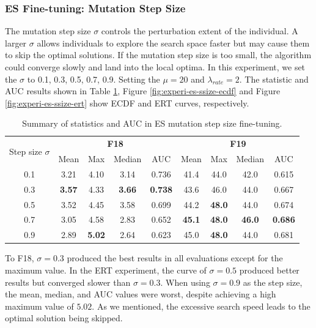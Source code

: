 \documentclass{article}
\begin{document}
\subsubsection{ES Fine-tuning: Mutation Step Size}

The mutation step size $\sigma$ controls the perturbation extent of the individual. A larger $\sigma$ allows individuals to explore the search space faster but may cause them to skip the optimal solutions. If the mutation step size is too small, the algorithm could converge slowly and land into the local optima. In this experiment, we set the $\sigma$ to 0.1, 0.3, 0.5, 0.7, 0.9. Setting the $\mu = 20$ and $\lambda_{rate} = 2$. The statistic and AUC results shown in Table \ref{tab:experi-es-ssize}, Figure \ref{fig:experi-es-ssize-ecdf} and Figure \ref{fig:experi-es-ssize-ert} show ECDF and ERT curves, respectively.


\begin{table}[!ht]
    \centering
    \caption{Summary of statistics and AUC in ES mutation step size fine-tuning.}
    \label{tab:experi-es-ssize}
    \begin{tabular}{ccccccccc}
        \toprule
        \multirow{2}[3]{*}{Step size $\sigma$} &
        \multicolumn{4}{c}{\textbf{F18}} &
        \multicolumn{4}{c}{\textbf{F19}}\\
        \cmidrule(lr){2-5}
        \cmidrule(lr){6-9}
        & Mean & Max & Median & AUC & Mean & Max & Median & AUC\\
        \midrule
        0.1  & 3.21 & 4.10 & 3.14 & 0.736 & 41.4 & 44.0 & 42.0 & 0.615 \\
        0.3  & \textbf{3.57} & 4.33 & \textbf{3.66} & \textbf{0.738} & 43.6 & 46.0 & 44.0 & 0.667\\
        0.5  & 3.52 & 4.45 & 3.58 & 0.699 & 44.2 & \textbf{48.0} & 44.0 & 0.674\\
        0.7  & 3.05 & 4.58 & 2.83 & 0.652 & \textbf{45.1} & \textbf{48.0} & \textbf{46.0} & \textbf{0.686}\\
        0.9  & 2.89 & \textbf{5.02} & 2.64 & 0.623 & 45.0 & \textbf{48.0} & 44.0 & 0.681\\
        \bottomrule
    \end{tabular}
\end{table}

To F18, $\sigma=0.3$ produced the best results in all evaluations except for the maximum value. In the ERT experiment, the curve of $\sigma=0.5$ produced better results but converged slower than $\sigma=0.3$. When using $\sigma=0.9$ as the step size, the mean, median, and AUC values were worst, despite achieving a high maximum value of $5.02$. As we mentioned, the excessive search speed leads to the optimal solution being skipped. 
\end{document}
